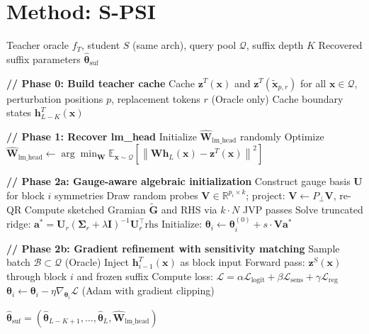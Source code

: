 \documentclass{article}
\newcommand{\R}{\mathbb{R}}
\newcommand{\E}{\mathbb{E}}
\newcommand{\cQ}{\mathcal{Q}}
\newcommand{\cL}{\mathcal{L}}
\newcommand{\btheta}{\boldsymbol{\theta}}
\newcommand{\bz}{\mathbf{z}}
\newcommand{\bh}{\mathbf{h}}
\newcommand{\bx}{\mathbf{x}}
\newcommand{\bW}{\mathbf{W}}
\newcommand{\bG}{\mathbf{G}}
\newcommand{\bV}{\mathbf{V}}
\newcommand{\bU}{\mathbf{U}}
\newcommand{\bI}{\mathbf{I}}
\newcommand{\cB}{\mathcal{B}}
\newcommand{\norm}[1]{\left\lVert #1 \right\rVert}
\begin{document}
\section{Method: S-PSI}
\label{sec:method}

\begin{algorithm}[t]
\caption{S-PSI: Sensitivity-Guided Progressive Suffix Inversion}
\label{alg:spsi}
\begin{algorithmic}[1]
\REQUIRE Teacher oracle $f_T$, student $S$ (same arch), query pool $\cQ$, suffix depth $K$
\ENSURE Recovered suffix parameters $\hat{\btheta}_{\text{suf}}$

\STATE \textbf{// Phase 0: Build teacher cache}
\STATE Cache $\bz^T(\bx)$ and $\bz^T(\tilde{\bx}_{p,r})$ for all $\bx \in \cQ$, perturbation positions $p$, replacement tokens $r$
\STATE (Oracle only) Cache boundary states $\bh^T_{L-K}(\bx)$

\STATE \textbf{// Phase 1: Recover lm\_head}
\STATE Initialize $\hat{\bW}_\text{lm\_head}$ randomly
\STATE Optimize $\hat{\bW}_\text{lm\_head} \leftarrow \arg\min_{\bW} \E_{\bx \sim \cQ}[\norm{\bW \bh_L(\bx) - \bz^T(\bx)}^2]$

    \STATE \textbf{// Phase 2a: Gauge-aware algebraic initialization}
    \STATE Construct gauge basis $\bU$ for block $i$ symmetries
    \STATE Draw random probes $\bV \in \R^{p_i \times k}$; project: $\bV \leftarrow P_\perp \bV$, re-QR
    \STATE Compute sketched Gramian $\tilde{\bG}$ and RHS via $k \cdot N$ JVP passes
    \STATE Solve truncated ridge: $\mathbf{a}^* = \bU_r(\boldsymbol{\Sigma}_r + \lambda \bI)^{-1}\bU_r^\top \text{rhs}$
    \STATE Initialize: $\btheta_i \leftarrow \btheta_i^{(0)} + s \cdot \bV \mathbf{a}^*$

    \STATE \textbf{// Phase 2b: Gradient refinement with sensitivity matching}
    \REPEAT
        \STATE Sample batch $\cB \subset \cQ$
        \STATE (Oracle) Inject $\bh^T_{i-1}(\bx)$ as block input
        \STATE Forward pass: $\bz^S(\bx)$ through block $i$ and frozen suffix
        \STATE Compute loss: $\cL = \alpha \cL_\text{logit} + \beta \cL_\text{sens} + \gamma \cL_\text{reg}$
        \STATE $\btheta_i \leftarrow \btheta_i - \eta \nabla_{\btheta_i} \cL$ \hfill (Adam with gradient clipping)
\ENDFOR

\RETURN $\hat{\btheta}_{\text{suf}} = (\hat{\btheta}_{L-K+1}, \ldots, \hat{\btheta}_L, \hat{\bW}_\text{lm\_head})$
\end{algorithmic}
\end{algorithm}
\end{document}
